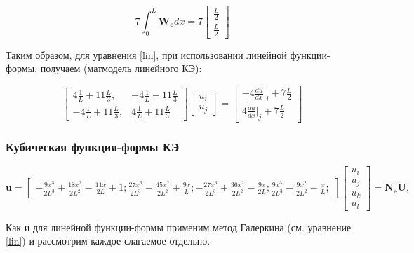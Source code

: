 $$7\int_0^L \mathbf{W_e} d x= 7
\begin{bmatrix}
	\frac{L}{2} \\
	\frac{L}{2}
\end{bmatrix}
$$

Таким образом, для уравнения \ref{lin}, при использовании линейной функции-формы,  получаем (матмодель линейного КЭ):

$$
\begin{bmatrix}
	4\frac{1}{L}    +11 \frac{L}{3}  , &   -4 \frac{1}{L}    +11 \frac{L}{3}   \\
	  -4  \frac{1}{L}   +11 \frac{L}{3}  , &  4\frac{1}{L}    +11 \frac{L}{3}  
\end{bmatrix}
\begin{bmatrix}
	u_i \\
	u_j
\end{bmatrix}=
\begin{bmatrix}
	  -4 \frac{du}{dx}|_i   +7  \frac{L}{2}\\
	4\frac{du}{dx}|_j   +7  \frac{L}{2}
\end{bmatrix}
$$


\subsubsection{Кубическая функция-формы КЭ}
$$
\mathbf{u}=\begin{bmatrix}
-\frac{9x^3}{2L^3}+\frac{18x^2}{2L^2}-\frac{11x}{2L} + 1;
\frac{27x^3}{2L^3}-\frac{45x^2}{2L^2}+\frac{9x}{L};
-\frac{27x^3}{2L^3}+\frac{36x^2}{2L^2}-\frac{9x}{2L};
\frac{9x^3}{2L^3}-\frac{9x^2}{2L^2}-\frac{x}{L};
\end{bmatrix}
\begin{bmatrix}
u_i \\
u_j\\
u_k\\
u_l
\end{bmatrix}
=\mathbf{N_eU},
$$

Как и для линейной функции-формы применим метод Галеркина (см. уравнение \ref{lin}) и рассмотрим каждое слагаемое отдельно.

